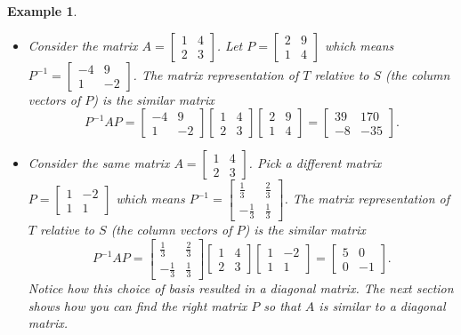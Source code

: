 \documentclass[10pt]{article}
\theoremstyle{plain}
\theoremstyle{box}
\newtheorem{example}{Example}
\begin{document}
\begin{example}
\begin{itemize}
\item
 Consider the matrix
 $A=  
\begin{bmatrix}
 1 & 4 \\
 2 & 3
\end{bmatrix} 
$. Let
$P=
\begin{bmatrix}
 2 & 9 \\
 1 & 4
\end{bmatrix} 
$ which means 
$P^{-1} = 
\begin{bmatrix}
 -4 & 9 \\
 1 & -2
\end{bmatrix} 
$. The matrix representation of $T$ relative to $S$ (the column vectors of $P$) is the similar matrix 
$$
P^{-1}AP=\begin{bmatrix}
 -4 & 9 \\
 1 & -2
\end{bmatrix} 
 \begin{bmatrix}
 1 & 4 \\
 2 & 3
\end{bmatrix} 
\begin{bmatrix}
 2 & 9 \\
 1 & 4
\end{bmatrix} 
=
\begin{bmatrix}
 39 & 170 \\
 -8 & -35
\end{bmatrix} 
.$$

\item
 Consider the same matrix
 $A=  
\begin{bmatrix}
 1 & 4 \\
 2 & 3
\end{bmatrix} 
$. Pick a different matrix 
$P=
\begin{bmatrix}
 1 & -2 \\
 1 & 1
\end{bmatrix} 
$ which means 
$P^{-1} = 
\begin{bmatrix}
 \frac{1}{3} & \frac{2}{3} \\
 -\frac{1}{3} & \frac{1}{3}
\end{bmatrix} 
$. The matrix representation of $T$ relative to $S$ (the column vectors of $P$) is the similar matrix 
$$
P^{-1}AP=\begin{bmatrix}
 \frac{1}{3} & \frac{2}{3} \\
 -\frac{1}{3} & \frac{1}{3}
\end{bmatrix} 
 \begin{bmatrix}
 1 & 4 \\
 2 & 3
\end{bmatrix} 
\begin{bmatrix}
 1 & -2 \\
 1 & 1
\end{bmatrix} 
=
\begin{bmatrix}
 5 & 0 \\
 0 & -1
\end{bmatrix} 
.$$  Notice how this choice of basis resulted in a diagonal matrix. The next section shows how you can find the right matrix $P$ so that $A$ is similar to a diagonal matrix.


\end{itemize}
\end{example}
\end{document}
